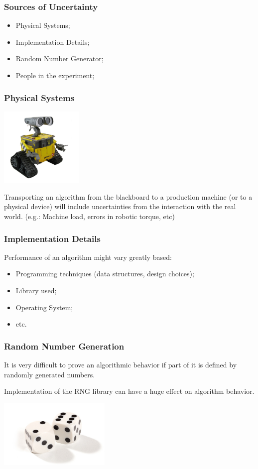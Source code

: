 \documentclass{beamer}
\begin{document}
\begin{frame}
  \frametitle{Sources of Uncertainty}
  \begin{itemize}
  \item Physical Systems;
  \item Implementation Details;
  \item Random Number Generator;
  \item People in the experiment;
  \end{itemize}
\end{frame}

\begin{frame}
  \frametitle{Physical Systems}
  \includegraphics[width=0.3\textwidth]{img/robot}
  \begin{block}{}
    Transporting an algorithm from the blackboard to a production
    machine (or to a physical device) will include uncertainties from
    the interaction with the real world.
    \medskip
    (e.g.: Machine load, errors in robotic torque, etc)
  \end{block}
\end{frame}

\begin{frame}
  \frametitle{Implementation Details}
  \begin{block}{}
    Performance of an algorithm might vary greatly based:
    \begin{itemize}
    \item Programming techniques (data structures, design choices);
    \item Library used;
    \item Operating System;
    \item etc.
    \end{itemize}
  \end{block}
\end{frame}

\begin{frame}
  \frametitle{Random Number Generation}
  \begin{block}{}
    It is very difficult to prove an algorithmic behavior if part of
    it is defined by randomly generated numbers.
    \medskip

    Implementation of the RNG library can have a huge effect on
    algorithm behavior.
  \end{block}

  \hfill
  \includegraphics[width=0.4\textwidth]{img/dice}
\end{frame}
\end{document}
